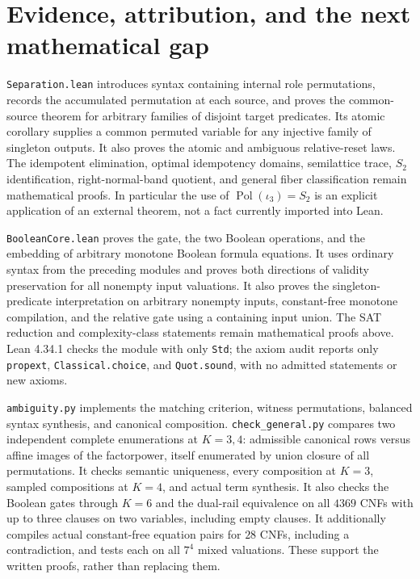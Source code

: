 \documentclass[11pt]{article}
\begin{document}
\section{Evidence, attribution, and the next mathematical gap}

\texttt{Separation.lean} introduces syntax containing internal role
permutations, records the accumulated permutation at each source, and
proves the common-source theorem for arbitrary families of disjoint
target predicates. Its atomic corollary supplies a common permuted
variable for any injective family of singleton outputs. It also proves
the atomic and ambiguous relative-reset laws. The idempotent elimination,
optimal idempotency domains, semilattice trace, $S_2$ identification,
right-normal-band quotient, and general fiber classification remain
mathematical proofs. In particular the use of
$\operatorname{Pol}(\iota_3)=S_2$ is an explicit application of an external
theorem, not a fact currently imported into Lean.

\texttt{BooleanCore.lean} proves the gate, the two Boolean operations,
and the embedding of arbitrary monotone Boolean formula equations. It
uses ordinary syntax from the preceding modules and proves both
directions of validity preservation for all nonempty input valuations.
It also proves the singleton-predicate interpretation on arbitrary
nonempty inputs, constant-free monotone compilation, and the relative
gate using a containing input union. The SAT reduction and
complexity-class statements remain mathematical
proofs above. Lean 4.34.1 checks the module with only \texttt{Std}; the
axiom audit reports only \texttt{propext}, \texttt{Classical.choice}, and
\texttt{Quot.sound}, with no admitted statements or new axioms.

\texttt{ambiguity.py} implements the matching criterion, witness
permutations, balanced syntax synthesis, and canonical composition.
\texttt{check\_general.py} compares two independent complete
enumerations at $K=3,4$: admissible canonical rows versus affine images
of the factorpower, itself enumerated by union closure of all
permutations. It checks semantic uniqueness, every composition at $K=3$,
sampled compositions at $K=4$, and actual term synthesis. It also checks
the Boolean gates through $K=6$ and the dual-rail equivalence on all
$4369$ CNFs with up to three clauses on two variables, including empty
clauses. It additionally compiles actual constant-free equation pairs for
$28$ CNFs, including a contradiction, and tests each on all $7^4$ mixed
valuations. These support the written proofs, rather than replacing them.
\end{document}
